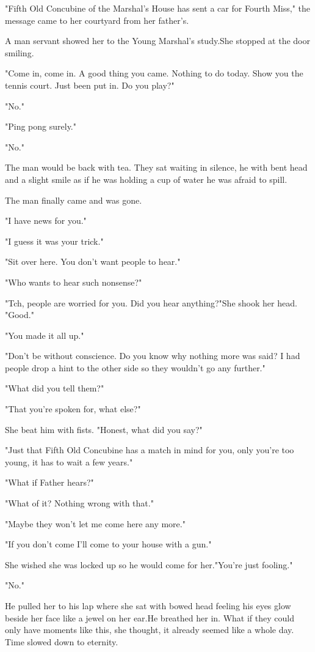 \par "Fifth Old Concubine of the Marshal's House has sent a car for Fourth Miss," the message came to her courtyard from her father's.
\par A man servant showed her to the Young Marshal's study.She stopped at the door smiling.
\par "Come in, come in. A good thing you came. Nothing to do today. Show you the tennis court. Just been put in. Do you play?"
\par "No."
\par "Ping pong surely."
\par "No."
\par The man would be back with tea. They sat waiting in silence, he with bent head and a slight smile as if he was holding a cup of water he was afraid to spill.
\par The man finally came and was gone.
\par "I have news for you."
\par "I guess it was your trick."
\par "Sit over here. You don't want people to hear."
\par "Who wants to hear such nonsense?"
\par "Tch, people are worried for you. Did you hear anything?"She shook her head. "Good."
\par "You made it all up."
\par "Don't be without conscience. Do you know why nothing more was said? I had people drop a hint to the other side so they wouldn't go any further."
\par "What did you tell them?"
\par "That you're spoken for, what else?"
\par She beat him with fists. "Honest, what did you say?"
\par "Just that Fifth Old Concubine has a match in mind for you, only you're too young, it has to wait a few years."
\par "What if Father hears?"
\par "What of it? Nothing wrong with that."
\par "Maybe they won't let me come here any more."
\par "If you don't come I'll come to your house with a gun."
\par She wished she was locked up so he would come for her."You're just fooling."
\par "No."
\par He pulled her to his lap where she sat with bowed head feeling his eyes glow beside her face like a jewel on her ear.He breathed her in. What if they could only have moments like this, she thought, it already seemed like a whole day. Time slowed down to eternity.
